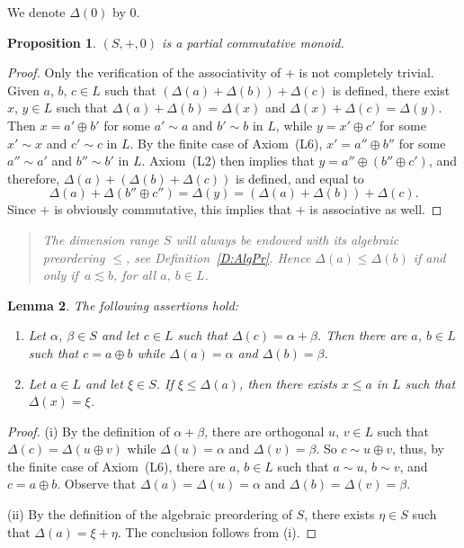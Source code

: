 \documentclass[psamsfonts,reqno]{memo-l}
\theoremstyle{plain}
\newtheorem{lemma}{Lemma}[section]
\newtheorem{proposition}[lemma]{Proposition}
\theoremstyle{definition}
\theoremstyle{remark}
\numberwithin{equation}{section}
\renewcommand{\iff}{if and only if}
\newcommand{\pcm}{partial commutative mon\-oid}
\newcommand{\DD}{\Delta}
\begin{document}
We denote $\DD(0)$ by $0$.

\begin{proposition}\label{P:Spcm}
$(S,+,0)$ is a \pcm.
\end{proposition}

\begin{proof}
Only the verification of the associativity of $+$ is not completely
trivial. Given $a$, $b$, $c\in L$ such that $(\DD(a)+\DD(b))+\DD(c)$ is
defined, there exist $x$, $y\in L$ such that $\DD(a)+\DD(b)=\DD(x)$ and
$\DD(x)+\DD(c)=\DD(y)$. Then $x=a'\oplus b'$ for some $a'\sim a$ and
$b'\sim b$ in $L$, while $y=x'\oplus c'$ for some $x'\sim x$ and $c'\sim c$
in $L$. By the finite case of Axiom~(L6), $x'=a''\oplus b''$ for some
$a''\sim a'$ and $b''\sim b'$ in $L$. Axiom~(L2) then implies that
$y=a''\oplus(b''\oplus c')$, and therefore, $\DD(a)+(\DD(b)+\DD(c))$
is defined, and equal to
   \[
   \DD(a)+\DD(b''\oplus c'')=\DD(y)=(\DD(a)+\DD(b))+\DD(c).
   \]
Since $+$ is obviously commutative, this implies that $+$ is associative as
well.
\end{proof}

\begin{quote}
\em The dimension range $S$ will always be endowed
with its \emph{algebraic} preordering $\leq$, see
Definition~\textup{\ref{D:AlgPr}}. Hence
$\DD(a)\leq\DD(b)$ \iff\ $a\lesssim b$, for all $a$, $b\in L$.
\end{quote}

\begin{lemma}\label{L:DelVmeas}
The following assertions hold:
\begin{enumerate}
\item Let $\alpha$, $\beta\in S$ and let $c\in L$ such that
$\DD(c)=\alpha+\beta$. Then there are $a$, $b\in L$ such that $c=a\oplus b$
while $\DD(a)=\alpha$ and $\DD(b)=\beta$.

\item Let $a\in L$ and let $\xi\in S$. If $\xi\leq\DD(a)$, then there exists
$x\leq a$ in $L$ such that $\DD(x)=\xi$.
\end{enumerate}
\end{lemma}

\begin{proof}
(i) By the definition of $\alpha+\beta$, there are orthogonal $u$, $v\in L$
such that $\DD(c)=\DD(u\oplus v)$ while $\DD(u)=\alpha$ and $\DD(v)=\beta$.
So $c\sim u\oplus v$, thus, by the finite case of Axiom~(L6), there are $a$,
$b\in L$ such that $a\sim u$, $b\sim v$, and $c=a\oplus b$. Observe that
$\DD(a)=\DD(u)=\alpha$ and $\DD(b)=\DD(v)=\beta$.

(ii) By the definition of the algebraic preordering of $S$, there exists
$\eta\in S$ such that $\DD(a)=\xi+\eta$. The conclusion follows from (i).
\end{proof}
\end{document}
